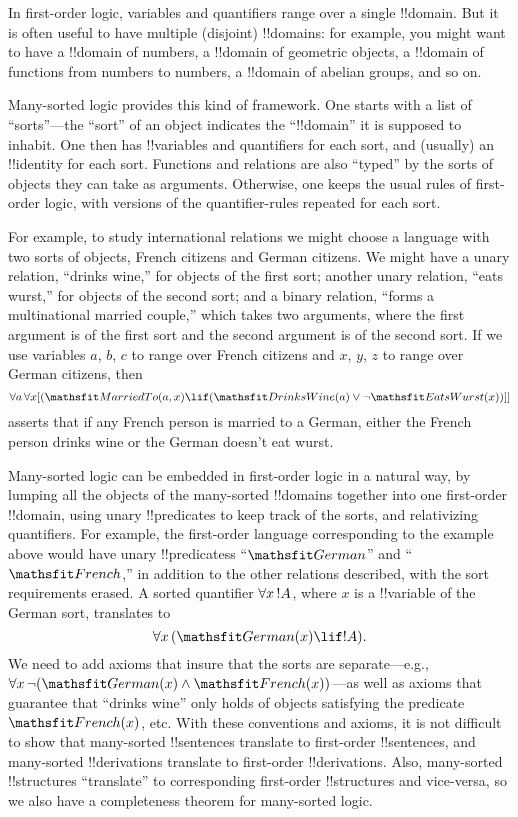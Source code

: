 \documentclass[../../../include/open-logic-section]{subfiles}
\begin{document}


In first-order logic, variables and quantifiers range over a single
!!{domain}. But it is often useful to have multiple (disjoint)
!!{domain}s: for example, you might want to have a !!{domain} of numbers,
a !!{domain} of geometric objects, a !!{domain} of functions from
numbers to numbers, a !!{domain} of abelian groups, and so on.

Many-sorted logic provides this kind of framework. One starts with a
list of ``sorts''---the ``sort'' of an object indicates the
``!!{domain}'' it is supposed to inhabit. One then has !!{variable}s
and quantifiers for each sort, and (usually) an !!{identity} for each
sort. Functions and relations are also ``typed'' by the sorts of
objects they can take as arguments. Otherwise, one keeps the usual
rules of first-order logic, with versions of the quantifier-rules
repeated for each sort.

For example, to study international relations we might choose a
language with two sorts of objects, French citizens and German
citizens. We might have a unary relation, ``drinks wine,'' for objects
of the first sort; another unary relation, ``eats wurst,'' for objects
of the second sort; and a binary relation, ``forms a multinational
married couple,'' which takes two arguments, where the first argument
is of the first sort and the second argument is of the second sort. If
we use variables $a$, $b$, $c$ to range over French citizens and $x$, $y$, $z$
to range over German citizens, then
\[
\lforall[a][\lforall x][(\Atom{\Obj{MarriedTo}}{a,x} \lif
(\Atom{\Obj{DrinksWine}}{a} \lor \lnot \Atom{\Obj{EatsWurst}}{x})]]
\]
asserts that if any French person is married to a German, either the
French person drinks wine or the German doesn't eat wurst.

Many-sorted logic can be embedded in first-order logic in a natural
way, by lumping all the objects of the many-sorted !!{domain}s together
into one first-order !!{domain}, using unary !!{predicate}s to keep track of
the sorts, and relativizing quantifiers. For example, the first-order
language corresponding to the example above would have unary !!{predicate}ss
``$\Obj{German}$'' and ``$\Obj{French}$,'' in addition to the other relations
described, with the sort requirements erased. A sorted quantifier $\lforall[x][!A]$, where $x$ is a !!{variable} of the German sort, translates to
\[
\lforall[x][(\Atom{\Obj{German}}{x} \lif !A)].
\]
We need to add axioms that insure that the sorts are separate---e.g.,
$\lforall[x][\lnot (\Atom{\Obj{German}}{x} \land
  \Atom{\Obj{French}}{x})]$---as well as axioms that guarantee that
``drinks wine'' only holds of objects satisfying the predicate
$\Atom{\Obj{French}}{x}$, etc. With these conventions and axioms, it
is not difficult to show that many-sorted !!{sentence}s translate to
first-order !!{sentence}s, and many-sorted !!{derivation}s translate
to first-order !!{derivation}s. Also, many-sorted !!{structure}s
``translate'' to corresponding first-order !!{structure}s and
vice-versa, so we also have a completeness theorem for many-sorted
logic.
\end{document}
